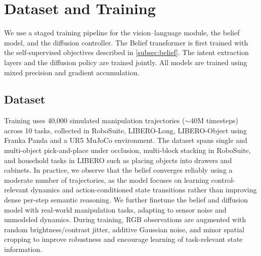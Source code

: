 \documentclass[conference]{IEEEtran}
\begin{document}
\section{Dataset and Training}
We use a staged training pipeline for  the vision–language module, the belief model, and the diffusion controller. The Belief transformer is first trained with the self-supervised objectives described in \ref{subsec:belief}. The intent extraction layers and the diffusion policy are trained jointly. All models are trained using mixed precision and gradient accumulation.

\subsection{Dataset}
Training uses 40,000 simulated manipulation trajectories ($\sim$40M timesteps) across 10 tasks, collected in RoboSuite, LIBERO-Long, LIBERO-Object using Franka Panda and a UR5 MuJoCo environment. The dataset spans single and multi-object pick-and-place under occlusion, multi-block stacking in RoboSuite, and household tasks in LIBERO such as placing objects into drawers and cabinets. In practice, we observe that the belief converges reliably using a moderate number of trajectories, as the model focuses on learning control-relevant dynamics and action-conditioned state transitions rather than improving dense per-step semantic reasoning. We further finetune the belief and diffusion model with real-world manipulation tasks, adapting to sensor noise and unmodeled dynamics. During training, RGB observations are augmented with random brightness/contrast jitter, additive Gaussian noise, and minor spatial cropping to improve robustness and encourage learning of task-relevant state information.
\end{document}

